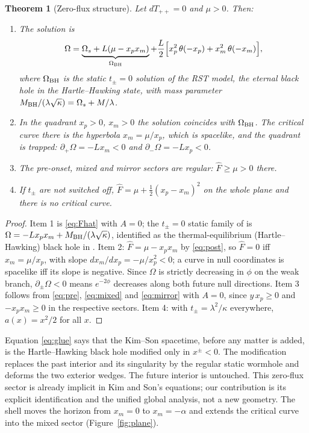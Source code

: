 \documentclass[11pt]{article}
\newtheorem{theorem}{Theorem}
\theoremstyle{remark}
\newcommand{\Fh}{\widehat F}
\begin{document}
\begin{theorem}[Zero-flux structure]\label{thm:zero}
Let $dT_{++}=0$ and $\mu>0$. Then:
\begin{enumerate}
\item The solution is
\begin{equation}\label{eq:glue}
\Omega=\underbrace{\Omega_s+L(\mu-x_px_m)}_{\Omega_{\rm BH}}+\frac L2\Bigl[x_p^2\,\theta(-x_p)+x_m^2\,\theta(-x_m)\Bigr],
\end{equation}
where $\Omega_{\rm BH}$ is the static $t_\pm=0$ solution of the RST model, the eternal black hole in the Hartle--Hawking state, with mass parameter $M_{\rm BH}/(\lambda\sqrt\kappa)=\Omega_s+M/\lambda$.
\item In the quadrant $x_p>0$, $x_m>0$ the solution coincides with $\Omega_{\rm BH}$. The critical curve there is the hyperbola $x_m=\mu/x_p$, which is spacelike, and the quadrant is trapped: $\partial_+\Omega=-Lx_m<0$ and $\partial_-\Omega=-Lx_p<0$.
\item The pre-onset, mixed and mirror sectors are regular: $\Fh\ge\mu>0$ there.
\item If $t_\pm$ are not switched off, $\Fh=\mu+\tfrac12(x_p-x_m)^2$ on the whole plane and there is no critical curve.
\end{enumerate}
\end{theorem}
\begin{proof}
Item 1 is \eqref{eq:Fhat} with $A=0$; the $t_\pm=0$ static family of \cite{RST} is $\Omega=-Lx_px_m+M_{\rm BH}/(\lambda\sqrt\kappa)$, identified as the thermal-equilibrium (Hartle--Hawking) black hole in \cite{RST,FPST,Solodukhin}. Item 2: $\Fh=\mu-x_px_m$ by \eqref{eq:post}, so $\Fh=0$ iff $x_m=\mu/x_p$, with slope $dx_m/dx_p=-\mu/x_p^2<0$; a curve in null coordinates is spacelike iff its slope is negative. Since $\Omega$ is strictly decreasing in $\phi$ on the weak branch, $\partial_\pm\Omega<0$ means $e^{-2\phi}$ decreases along both future null directions. Item 3 follows from \eqref{eq:pre}, \eqref{eq:mixed} and \eqref{eq:mirror} with $A=0$, since $y\,x_p\ge0$ and $-x_px_m\ge0$ in the respective sectors. Item 4: with $t_\pm=\lambda^2/\kappa$ everywhere, $a(x)=x^2/2$ for all $x$.
\end{proof}

Equation \eqref{eq:glue} says that the Kim--Son spacetime, before any matter is added, is the Hartle--Hawking black hole modified only in $x^\pm<0$. The modification replaces the past interior and its singularity by the regular static wormhole and deforms the two exterior wedges. The future interior is untouched. This zero-flux sector is already implicit in Kim and Son's equations; our contribution is its explicit identification and the unified global analysis, not a new geometry. The shell moves the horizon from $x_m=0$ to $x_m=-\alpha$ and extends the critical curve into the mixed sector (Figure~\ref{fig:plane}).
\end{document}
